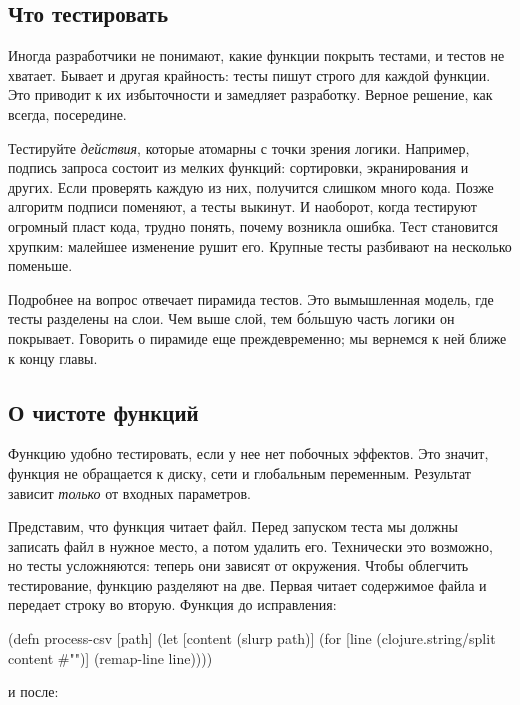 \subsection{Что тестировать}

Иногда разработчики не понимают, какие функции покрыть тестами, и тестов не
хватает. Бывает и другая крайность: тесты пишут строго для каждой функции. Это
приводит к их избыточности и замедляет разработку. Верное решение, как всегда,
посередине.

Тестируйте \emph{действия}, которые атомарны с точки зрения логики. Например,
подпись запроса состоит из мелких функций: сортировки, экранирования и
других. Если проверять каждую из них, получится слишком много кода. Позже
алгоритм подписи поменяют, а тесты выкинут. И наоборот, когда тестируют огромный
пласт кода, трудно понять, почему возникла ошибка. Тест становится хрупким:
малейшее изменение рушит его. Крупные тесты разбивают на несколько поменьше.

Подробнее на вопрос отвечает пирамида
тестов. Это вымышленная
модель, где тесты разделены на слои. Чем выше слой, тем б\'{о}льшую часть логики
он покрывает. Говорить о пирамиде еще преждевременно; мы вернемся к ней ближе к
концу главы.

\subsection{О чистоте функций}

Функцию удобно тестировать, если у нее нет побочных эффектов. Это значит,
функция не обращается к диску, сети и глобальным переменным. Результат зависит
\emph{только} от входных параметров.

Представим, что функция читает файл. Перед запуском теста мы должны записать
файл в нужное место, а потом удалить его. Технически это возможно, но тесты
усложняются: теперь они зависят от окружения. Чтобы облегчить тестирование,
функцию разделяют на две. Первая читает содержимое файла и передает строку во
вторую. Функция до исправления:

\begin{english}
  \begin{clojure}
(defn process-csv [path]
  (let [content (slurp path)]
    (for [line (clojure.string/split content #"\n")]
      (remap-line line))))
  \end{clojure}
\end{english}

\noindent
и после:

